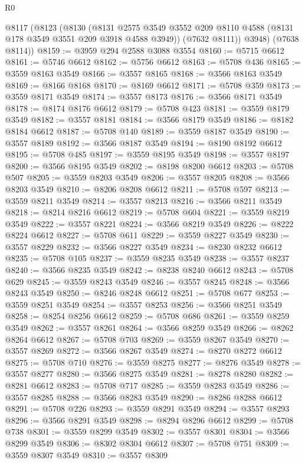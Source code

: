 \begin{lexlean}{R0}
\begin{coremodule}
    @8117
      (@8123
        (@8130
          (@8131 @2575 @3549 @3552 @209 @8110 @4588 (@8131 @178 @3549 @3551 @209 @3918 @4588 @3949))
          (@7632 @8111))
        @3948)
      (@7638 @8114))
@8159 := @3959 @294 @2588 @3088 @3554
@8160 := @5715 @6612
@8161 := @5746 @6612
@8162 := @5756 @6612
@8163 := @5708 @436
@8165 := @3559 @8163 @3549
@8166 := @3557 @8165
@8168 := @3566 @8163 @3549
@8169 := @8166 @8168
@8170 := @8169 @6612
@8171 := @5708 @359
@8173 := @3559 @8171 @3549
@8174 := @3557 @8173
@8176 := @3566 @8171 @3549
@8178 := @8174 @8176 @6612
@8179 := @5708 @423
@8181 := @3559 @8179 @3549
@8182 := @3557 @8181
@8184 := @3566 @8179 @3549
@8186 := @8182 @8184 @6612
@8187 := @5708 @140
@8189 := @3559 @8187 @3549
@8190 := @3557 @8189
@8192 := @3566 @8187 @3549
@8194 := @8190 @8192 @6612
@8195 := @5708 @485
@8197 := @3559 @8195 @3549
@8198 := @3557 @8197
@8200 := @3566 @8195 @3549
@8202 := @8198 @8200 @6612
@8203 := @5708 @507
@8205 := @3559 @8203 @3549
@8206 := @3557 @8205
@8208 := @3566 @8203 @3549
@8210 := @8206 @8208 @6612
@8211 := @5708 @597
@8213 := @3559 @8211 @3549
@8214 := @3557 @8213
@8216 := @3566 @8211 @3549
@8218 := @8214 @8216 @6612
@8219 := @5708 @604
@8221 := @3559 @8219 @3549
@8222 := @3557 @8221
@8224 := @3566 @8219 @3549
@8226 := @8222 @8224 @6612
@8227 := @5708 @611
@8229 := @3559 @8227 @3549
@8230 := @3557 @8229
@8232 := @3566 @8227 @3549
@8234 := @8230 @8232 @6612
@8235 := @5708 @105
@8237 := @3559 @8235 @3549
@8238 := @3557 @8237
@8240 := @3566 @8235 @3549
@8242 := @8238 @8240 @6612
@8243 := @5708 @629
@8245 := @3559 @8243 @3549
@8246 := @3557 @8245
@8248 := @3566 @8243 @3549
@8250 := @8246 @8248 @6612
@8251 := @5708 @677
@8253 := @3559 @8251 @3549
@8254 := @3557 @8253
@8256 := @3566 @8251 @3549
@8258 := @8254 @8256 @6612
@8259 := @5708 @686
@8261 := @3559 @8259 @3549
@8262 := @3557 @8261
@8264 := @3566 @8259 @3549
@8266 := @8262 @8264 @6612
@8267 := @5708 @703
@8269 := @3559 @8267 @3549
@8270 := @3557 @8269
@8272 := @3566 @8267 @3549
@8274 := @8270 @8272 @6612
@8275 := @5708 @710
@8276 := @3559 @8275
@8277 := @8276 @3549
@8278 := @3557 @8277
@8280 := @3566 @8275 @3549
@8281 := @8278 @8280
@8282 := @8281 @6612
@8283 := @5708 @717
@8285 := @3559 @8283 @3549
@8286 := @3557 @8285
@8288 := @3566 @8283 @3549
@8290 := @8286 @8288 @6612
@8291 := @5708 @226
@8293 := @3559 @8291 @3549
@8294 := @3557 @8293
@8296 := @3566 @8291 @3549
@8298 := @8294 @8296 @6612
@8299 := @5708 @738
@8301 := @3559 @8299 @3549
@8302 := @3557 @8301
@8304 := @3566 @8299 @3549
@8306 := @8302 @8304 @6612
@8307 := @5708 @751
@8309 := @3559 @8307 @3549
@8310 := @3557 @8309

\end{coremodule}
\end{lexlean}
